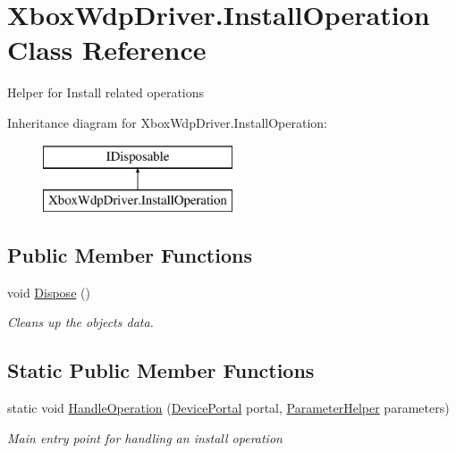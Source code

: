 \hypertarget{class_xbox_wdp_driver_1_1_install_operation}{}\section{Xbox\+Wdp\+Driver.\+Install\+Operation Class Reference}
\label{class_xbox_wdp_driver_1_1_install_operation}


Helper for Install related operations  


Inheritance diagram for Xbox\+Wdp\+Driver.\+Install\+Operation\+:\begin{figure}[H]
\begin{center}
\leavevmode
\includegraphics[height=2.000000cm]{class_xbox_wdp_driver_1_1_install_operation}
\end{center}
\end{figure}
\subsection*{Public Member Functions}
\begin{DoxyCompactItemize}
\item 
void \hyperlink{class_xbox_wdp_driver_1_1_install_operation_aa81341291a8f3908e90e2d2a45689479}{Dispose} ()
\begin{DoxyCompactList}\small\item\em Cleans up the object\textquotesingle{}s data. \end{DoxyCompactList}\end{DoxyCompactItemize}
\subsection*{Static Public Member Functions}
\begin{DoxyCompactItemize}
\item 
static void \hyperlink{class_xbox_wdp_driver_1_1_install_operation_a8d3fa42d4bc4b13423562f204f9ac0c0}{Handle\+Operation} (\hyperlink{class_microsoft_1_1_tools_1_1_windows_device_portal_1_1_device_portal}{Device\+Portal} portal, \hyperlink{class_xbox_wdp_driver_1_1_parameter_helper}{Parameter\+Helper} parameters)
\begin{DoxyCompactList}\small\item\em Main entry point for handling an install operation \end{DoxyCompactList}\end{DoxyCompactItemize}
